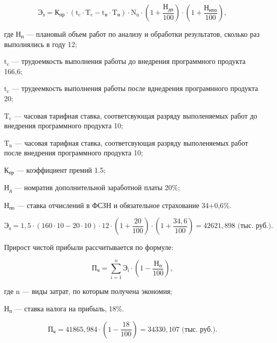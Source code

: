 \begin{displaymath}
  \text{Э}_{\text{з}} = \text{К}_{\text{пр}}\cdot(\text{t}_{\text{c}}\cdot\text{T}_{\text{c}}-\text{t}_{\text{н}}\cdot\text{T}_{\text{н}})\cdot\text{N}_{\text{n}}\cdot
  (1+\frac{\text{Н}_{\text{дп}}}{100})\cdot(1+\frac{\text{Н}_{\text{нпо}}}{100}),
\end{displaymath}

где \(\text{Н}_{\text{п}}\) --- плановый объем работ по анализу и обработки результатов, сколько раз выполнялись в году 12;

\(\text{t}_{\text{c}}\) --- трудоемкость выполнения работы до внедрения программного продукта 166,6; 

\(\text{t}_{\text{c}}\) --- трудеемкость выполнения работы после вднедрения програмнного продукта 20;

\(\text{T}_{\text{c}}\) --- часовая тарифная ставка, соответсвующая разряду выполеняемых работ до внедрения программного продукта 10;

\(\text{T}_{\text{n}}\) --- часовая тарифная ставка, соответсвующая разряду выполеняемых работ после внедрения программного продукта 10;

\(\text{К}_{\text{пр}}\) --- коэффициент премий 1.5; 

\(\text{Н}_{\text{д}}\) --- номратив дополнительной заработной платы 20\%;

\(\text{Н}_{\text{по}}\) --- ставка отчислений в ФСЗН и обязательное страхование 34+0,6\%. 

\begin{displaymath}
    \text{Э}_{\text{з}} = 1,5\cdot(160\cdot10-20\cdot10)\cdot12\cdot(1+\frac{20}{100})\cdot(1+\frac{34,6}{100}) = 42621,898 \text{ (тыс. руб.)}.
\end{displaymath}

Прирост чистой прибыли рассчитывается по формуле:

\begin{displaymath}
  \text{П}_{\text{ч}} = \sum\limits_{i=1}^n \text{Э}_{\text{i}}\cdot(1-\frac{\text{Н}_{\text{п}}}{100}),
\end{displaymath}

где \(\text{n}\) --- виды затрат, по которым получена экономия;

\(\text{Н}_{\text{п}}\) --- ставка налога на прибыль, 18\%.

\begin{displaymath}
    \text{П}_{\text{ч}} = 41865,984\cdot(1-\frac{18}{100}) = 34330,107 \text{ (тыс. руб.)}.
\end{displaymath}


